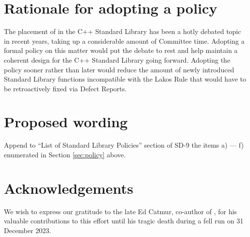 
\section{Rationale for adopting a policy}
\label{sec:rationale_adopt}

The placement of  in the C++ Standard Library has been a hotly debated topic in recent years, taking up a considerable amount of Committee time. Adopting a formal policy on this matter would put the debate to rest and help maintain a coherent design for the C++ Standard Library going forward. Adopting the policy sooner rather than later would reduce the amount of newly introduced Standard Library functions incompatible with the Lakos Rule that would have to be retroactively fixed via Defect Reports. 


\section{Proposed wording}
\label{sec:wording}

Append to ``List of Standard Library Policies'' section of SD-9 the items a) --- f) enumerated in Section \ref{sec:policy} above.



\pagebreak %

\section*{Acknowledgements}
We wish to express our gratitude to the late Ed Catmur, co-author of \cite{P2831R0}, for his valuable contributions to this effort until his tragic death during a fell run on 31 December 2023.


\renewcommand{\bibname}{References}




